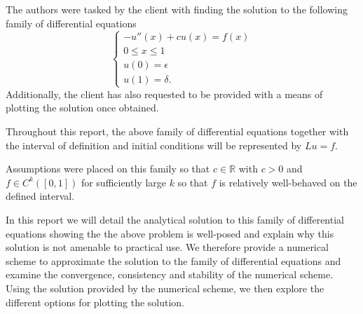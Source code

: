 The authors were tasked by the client with finding the solution to the following
family of differential equations
\[
  \begin{cases}
    -u''(x) + c u(x) = f(x) \\
    0 \leq x \leq 1 \\
    u(0) = \epsilon \\
    u(1) = \delta.
  \end{cases}
\]
Additionally, the client has also requested to be provided with a means of
plotting the solution once obtained.

Throughout this report, the above family of differential equations together with
the interval of definition and initial conditions will be represented by
$Lu = f$.

Assumptions were placed on this family so that $c \in \mathbb{R}$ with $c > 0$
and $f \in C^k([0,1])$ for sufficiently large $k$ so that $f$ is relatively
well-behaved on the defined interval.

In this report we will detail the analytical solution to this family of
differential equations showing the the above problem is well-posed and
explain why this solution is not amenable to practical use. We therefore
provide a numerical scheme to approximate the solution to the family of
differential equations and examine the convergence, consistency and stability
of the numerical scheme. Using the solution provided by the numerical scheme,
we then explore the different options for plotting the solution.
